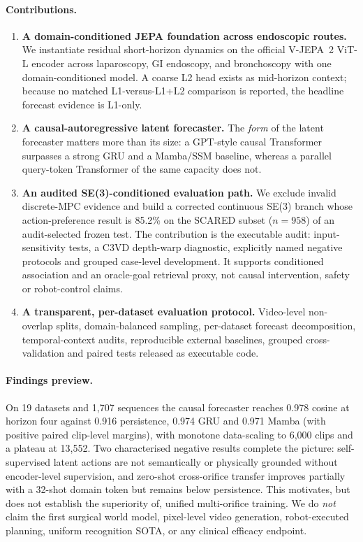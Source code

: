 \documentclass[preprint,12pt]{elsarticle}
\begin{document}
\paragraph{Contributions.}
\begin{enumerate}
  \item \textbf{A domain-conditioned JEPA foundation across endoscopic routes.}
  We instantiate residual short-horizon dynamics on the official V-JEPA~2 ViT-L encoder across laparoscopy, GI endoscopy, and bronchoscopy with one domain-conditioned model. A coarse L2 head exists as mid-horizon context; because no matched L1-versus-L1+L2 comparison is reported, the headline forecast evidence is L1-only.
  \item \textbf{A causal-autoregressive latent forecaster.}
  The \emph{form} of the latent forecaster matters more than its size: a GPT-style causal Transformer surpasses a strong GRU and a Mamba/SSM baseline, whereas a parallel query-token Transformer of the same capacity does not.
  \item \textbf{An audited SE(3)-conditioned evaluation path.}
  We exclude invalid discrete-MPC evidence and build a corrected continuous
  SE(3) branch whose action-preference result is 85.2\% on the SCARED subset
  ($n{=}958$) of an audit-selected frozen test. The contribution is the
  executable audit:
  input-sensitivity tests, a C3VD depth-warp diagnostic, explicitly named
  negative protocols and grouped case-level development. It supports
  conditioned association and an oracle-goal retrieval proxy, not causal
  intervention, safety or
  robot-control claims.
  \item \textbf{A transparent, per-dataset evaluation protocol.}
  Video-level non-overlap splits, domain-balanced sampling, per-dataset
  forecast decomposition, temporal-context audits, reproducible external
  baselines, grouped cross-validation and paired tests released as executable
  code.
\end{enumerate}

\paragraph{Findings preview.}
On 19 datasets and 1{,}707 sequences the causal forecaster reaches 0.978
cosine at horizon four against 0.916 persistence, 0.974 GRU and 0.971 Mamba
(with positive paired clip-level margins), with monotone data-scaling to 6{,}000 clips and
a plateau at 13{,}552. Two characterised negative results complete the
picture: self-supervised latent actions are not semantically or physically
grounded without encoder-level supervision, and zero-shot cross-orifice
transfer improves partially with a 32-shot domain token but remains below
persistence. This motivates, but does not establish the superiority of,
unified multi-orifice training.
We do \emph{not} claim the first surgical world model, pixel-level video
generation, robot-executed planning, uniform recognition SOTA, or any clinical
efficacy endpoint.
\end{document}

